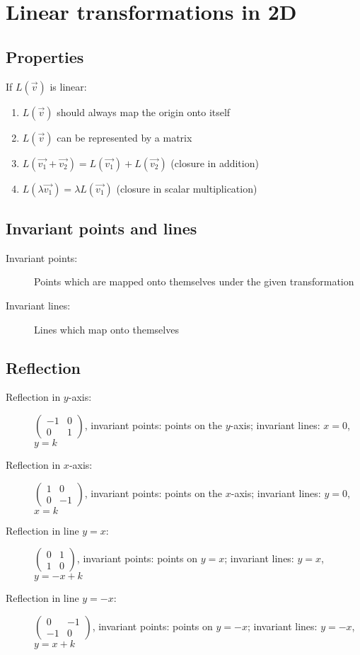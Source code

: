 \section{Linear transformations in 2D}
\subsection{Properties}
If $L(\vec{v})$ is linear:
\begin{enumerate}
	\item $L(\vec{v})$ should always map the origin onto itself
	\item $L(\vec{v})$ can be represented by a matrix
	\item $L(\vec{v_1}+\vec{v_2})=L(\vec{v_1})+L(\vec{v_2})$ (closure in addition)
	\item $L(\lambda\vec{v_1})=\lambda L(\vec{v_1})$ (closure in scalar multiplication)
\end{enumerate}
\subsection{Invariant points and lines}
\begin{description}
	\item[Invariant points:] Points which are mapped onto themselves under the given transformation
	\item[Invariant lines:] Lines which map onto themselves
\end{description}

\subsection{Reflection}
\begin{description}
	\item[Reflection in $y$-axis:] $\begin{pmatrix}
		-1&0\\0&1
	\end{pmatrix}$, invariant points: points on the $y$-axis; invariant lines: $x=0$, $y=k$
	\item[Reflection in $x$-axis:] $\begin{pmatrix}
		1&0\\0&-1
	\end{pmatrix}$, invariant points: points on the $x$-axis; invariant lines: $y=0$, $x=k$
	\item[Reflection in line $y=x$:] $\begin{pmatrix}
		0&1\\1&0
	\end{pmatrix}$, invariant points: points on $y=x$; invariant lines: $y=x$, $y=-x+k$
	\item[Reflection in line $y=-x$:] $\begin{pmatrix}
		0&-1\\-1&0
	\end{pmatrix}$, invariant points: points on $y=-x$; invariant lines: $y=-x$, $y=x+k$
\end{description}

